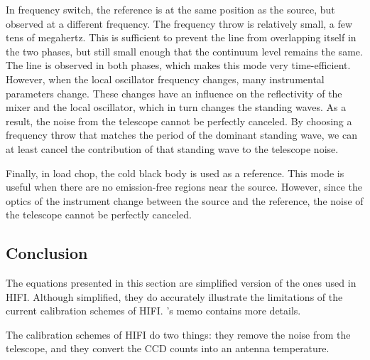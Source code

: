 In frequency switch, the reference is at the same position as the source, but observed at a different frequency.
The frequency throw is relatively small, a few tens of megahertz.
This is sufficient to prevent the line from overlapping itself in the two phases, but still small enough that the continuum level remains the same.
The line is observed in both phases, which makes this mode very time-efficient.
However, when the local oscillator frequency changes, many instrumental parameters change.
These changes have an influence on the reflectivity of the mixer and the local oscillator, which in turn changes the standing waves.
As a result, the noise from the telescope cannot be perfectly canceled.
By choosing a frequency throw that matches the period of the dominant standing wave, we can at least cancel the contribution of that standing wave to the telescope noise.

Finally, in load chop, the cold black body is used as a reference.
This mode is useful when there are no emission-free regions near the source.
However, since the optics of the instrument change between the source and the reference, the noise of the telescope cannot be perfectly canceled.

\subsection{Conclusion}
The equations presented in this section are simplified version of the ones used in HIFI.
Although simplified, they do accurately illustrate the limitations of the current calibration schemes of HIFI.
\citeauthor{ossenkopf2002intensity}'s memo \cite{ossenkopf2002intensity} contains more details.

The calibration schemes of HIFI do two things: they remove the noise from the telescope, and they convert the CCD counts into an antenna temperature.


